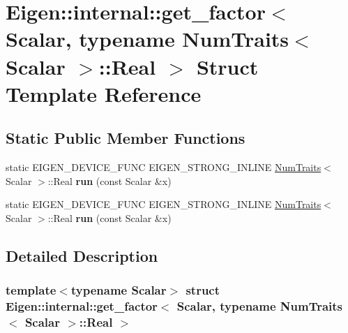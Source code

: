 \hypertarget{struct_eigen_1_1internal_1_1get__factor_3_01_scalar_00_01typename_01_num_traits_3_01_scalar_01_4_1_1_real_01_4}{}\section{Eigen\+:\+:internal\+:\+:get\+\_\+factor$<$ Scalar, typename Num\+Traits$<$ Scalar $>$\+:\+:Real $>$ Struct Template Reference}
\label{struct_eigen_1_1internal_1_1get__factor_3_01_scalar_00_01typename_01_num_traits_3_01_scalar_01_4_1_1_real_01_4}
\subsection*{Static Public Member Functions}
\begin{DoxyCompactItemize}
\item 
\mbox{\label{struct_eigen_1_1internal_1_1get__factor_3_01_scalar_00_01typename_01_num_traits_3_01_scalar_01_4_1_1_real_01_4_a77c0683a2db0297711412120fa9cc5ae}} 
static E\+I\+G\+E\+N\+\_\+\+D\+E\+V\+I\+C\+E\+\_\+\+F\+U\+NC E\+I\+G\+E\+N\+\_\+\+S\+T\+R\+O\+N\+G\+\_\+\+I\+N\+L\+I\+NE \hyperlink{group___core___module_struct_eigen_1_1_num_traits}{Num\+Traits}$<$ Scalar $>$\+::Real {\bfseries run} (const Scalar \&x)
\item 
\mbox{\label{struct_eigen_1_1internal_1_1get__factor_3_01_scalar_00_01typename_01_num_traits_3_01_scalar_01_4_1_1_real_01_4_a77c0683a2db0297711412120fa9cc5ae}} 
static E\+I\+G\+E\+N\+\_\+\+D\+E\+V\+I\+C\+E\+\_\+\+F\+U\+NC E\+I\+G\+E\+N\+\_\+\+S\+T\+R\+O\+N\+G\+\_\+\+I\+N\+L\+I\+NE \hyperlink{group___core___module_struct_eigen_1_1_num_traits}{Num\+Traits}$<$ Scalar $>$\+::Real {\bfseries run} (const Scalar \&x)
\end{DoxyCompactItemize}


\subsection{Detailed Description}
\subsubsection*{template$<$typename Scalar$>$\newline
struct Eigen\+::internal\+::get\+\_\+factor$<$ Scalar, typename Num\+Traits$<$ Scalar $>$\+::\+Real $>$}



